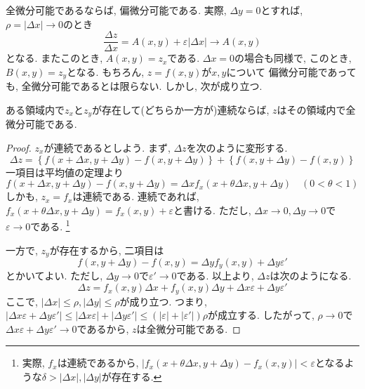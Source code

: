 \documentclass[a4j,dvipdfmx]{jsarticle}
\numberwithin{equation}{section}
\begin{document}
            全微分可能であるならば, 偏微分可能である. 実際, $\Delta y=0$とすれば, $\rho=|\Delta x|\to 0$のとき
            \begin{equation*}
                \frac{\Delta z}{\Delta x}=A(x,y)+\varepsilon|\Delta x|\to A(x,y)
            \end{equation*}
            となる. またこのとき, $A(x,y)=z_x$である. $\Delta x=0$の場合も同様で, このとき, $B(x,y)=z_y$となる. もちろん, $z=f(x,y)$が$x,y$について
            偏微分可能であっても, 全微分可能であるとは限らない. しかし, 次が成り立つ.
            \begin{screen}
                ある領域内で$z_{x}$と$z_{y}$が存在して(どちらか一方が)連続ならば, $z$はその領域内で全微分可能である.
            \end{screen}
            \begin{proof}
                $z_{x}$が連続であるとしよう. まず, $\Delta z$を次のように変形する.
                \begin{equation*}
                    \Delta z = \left\{f(x+\Delta x,y+\Delta y)-f(x,y+\Delta y)\right\}+\left\{f(x,y+\Delta y)-f(x,y)\right\}
                \end{equation*}
                一項目は平均値の定理より
                \begin{equation*}
                    f(x+\Delta x,y+\Delta y)-f(x,y+\Delta y)=\Delta xf_{x}(x+\theta\Delta x,y+\Delta y) \quad (0<\theta<1)
                \end{equation*}
                しかも, $z_{x}=f_x$は連続である. 連続であれば, $f_x(x+\theta\Delta x,y+\Delta y)=f_{x}(x,y)+\varepsilon$と書ける. ただし, $\Delta x\to 0,\Delta y\to 0$で$\varepsilon\to 0$である.
                \footnote{実際, $f_{x}$は連続であるから, $|f_{x}(x+\theta\Delta x,y+\Delta y)-f_{x}(x,y)|<\varepsilon$となるような$\delta>|\Delta x|,|\Delta y|$が存在する.}

                一方で, $z_y$が存在するから, 二項目は
                \begin{equation*}
                    f(x,y+\Delta y)-f(x,y)=\Delta yf_y(x,y)+\Delta y\varepsilon'
                \end{equation*}
                とかいてよい. ただし, $\Delta y\to 0$で$\varepsilon'\to 0$である. 以上より, $\Delta z$は次のようになる.
                \begin{equation*}
                    \Delta z= f_{x}(x,y)\Delta x +f_{y}(x,y)\Delta y + \Delta x \varepsilon+\Delta y\varepsilon'
                \end{equation*}
                ここで, $|\Delta x|\leq\rho,|\Delta y|\leq\rho$が成り立つ. つまり, $|\Delta x\varepsilon+\Delta y\varepsilon'|\leq |\Delta x\varepsilon|+|\Delta y\varepsilon'|\leq(|\varepsilon|+|\varepsilon'|)\rho$が成立する. 
                したがって, $\rho\to 0$で$\Delta x\varepsilon+\Delta y\varepsilon'\to 0$であるから, $z$は全微分可能である.
            \end{proof}
\end{document}
